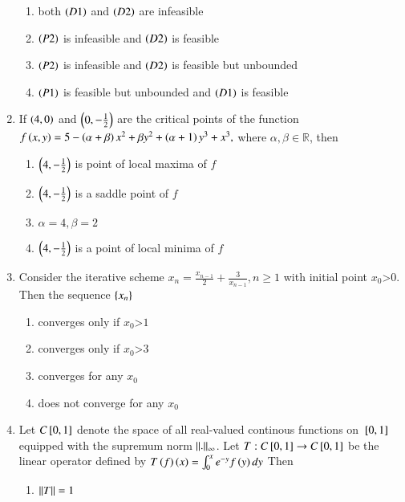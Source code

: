 \documentclass[journal]{IEEEtran}
\begin{document}
\begin{enumerate}
{\begin{enumerate}
\item both $\left(D1\right)$ and $\left(D2\right)$ are infeasible
\item $\left(P2\right)$ is infeasible and $\left(D2\right)$ is feasible
\item $\left(P2\right)$ is infeasible and $\left(D2\right)$ is feasible but unbounded
\item $\left(P1\right)$ is feasible but unbounded and $\left(D1\right)$ is feasible
\end{enumerate}
}
\item{
If $\left(4,0\right)$ and $\left(0,-\frac{1}{2}\right)$ are the critical points of the function $f\left(x,y\right)=5-\left(\alpha+\beta\right)x^2+\beta y^2+\left(\alpha+1\right)y^3+x^3,$ where $\alpha,\beta\in\mathbb{R}$, then
\begin{multicols}{2}
\begin{enumerate}
\item $\left(4,-\frac{1}{2}\right)$ is point of local maxima of $f$
\item $\left(4,-\frac{1}{2}\right)$ is a saddle point of $f$
\item $\alpha=4,\beta=2$
\item $\left(4,-\frac{1}{2}\right)$ is a point of local minima of $f$
\end{enumerate}
\end{multicols}
}
\item{
Consider the iterative scheme $x_n=\frac{x_{n-1}}{2}+\frac{3}{x_{n-1}},n\geq 1$ with initial point $x_0$\textgreater$0$. Then the sequence $\left\{x_n\right\}$ 
\begin{multicols}{2}
\begin{enumerate}
\item converges only if $x_0$\textgreater$1$
\item converges only if $x_0$\textgreater$3$
\item converges for any $x_0$
\item does not converge for any $x_0$
\end{enumerate}
\end{multicols}
}
\item{
Let $C{}\left[0,1\right]$ denote the space of all real-valued continous functions on ${}\left[0,1\right]$ equipped with the supremum norm $\left\lVert.\right\rVert_{\infty}$. Let $T:C{}\left[0,1\right]\rightarrow C{}\left[0,1\right]$ be the linear operator defined by $T\left(f\right)\left(x\right)=\int_0^xe^{-y}f\left(y\right)dy$ Then
\begin{multicols}{2}
\begin{enumerate}
\item $\left\lVert T\right\rVert=1$

\end{enumerate}
\end{multicols}}
\end{enumerate}
\end{document}
